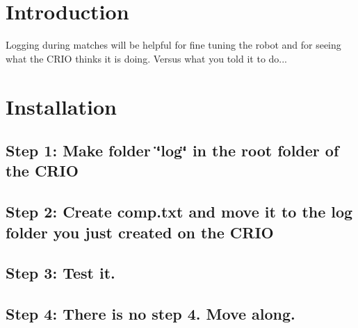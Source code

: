 \hypertarget{index_intro_sec}{}\section{Introduction}\label{index_intro_sec}
Logging during matches will be helpful for fine tuning the robot and for seeing what the C\-R\-I\-O thinks it is doing. Versus what you told it to do...\hypertarget{index_install_sec}{}\section{Installation}\label{index_install_sec}
\hypertarget{index_step1}{}\subsection{Step 1\-: Make folder \char`\"{}log\char`\"{} in the root folder of the C\-R\-I\-O}\label{index_step1}
\hypertarget{index_setp2}{}\subsection{Step 2\-: Create comp.\-txt and move it to the log folder you just created on the C\-R\-I\-O}\label{index_setp2}
\hypertarget{index_step3}{}\subsection{Step 3\-: Test it.}\label{index_step3}
\hypertarget{index_step4}{}\subsection{Step 4\-: There is no step 4. Move along.}\label{index_step4}

